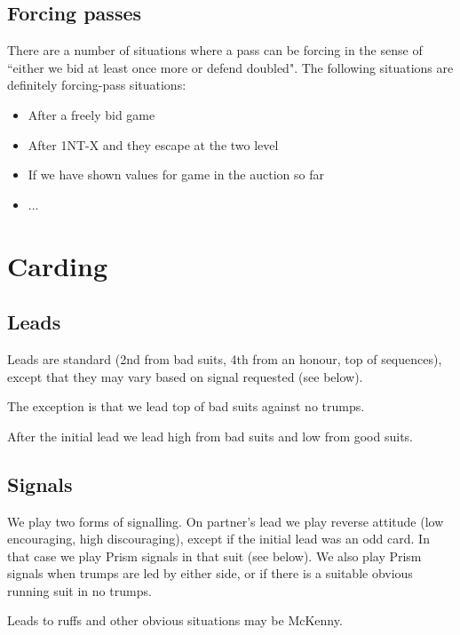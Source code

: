 \documentclass[a4paper,14pt]{extarticle}
\begin{document}
\subsection{Forcing passes}
\label{sec:forcepass}

There are a number of situations where a pass can be forcing in the sense of
``either we bid at least once more or defend doubled". The following situations
are definitely forcing-pass situations:

\begin{itemize}
\item After a freely bid game
\item After 1NT-X and they escape at the two level
\item If we have shown values for game in the auction so far
\item ...
\end{itemize}

\newpage

\section{Carding}
\label{sec:carding}

\subsection{Leads}
\label{sec:card:leads}

Leads are standard (2nd from bad suits, 4th from an honour, top of sequences),
except that they may vary based on signal requested (see below).

The exception is that we lead top of bad suits against no trumps.

After the initial lead we lead high from bad suits and low from good suits.

\subsection{Signals}
\label{sec:card:signals}

We play two forms of signalling. On partner's lead we play reverse attitude
(low encouraging, high discouraging), except if the initial lead was an odd
card. In that case we play Prism signals in that suit (see below). We also play
Prism signals when trumps are led by either side, or if there is a suitable
obvious running suit in no trumps.

Leads to ruffs and other obvious situations may be McKenny.
\end{document}
